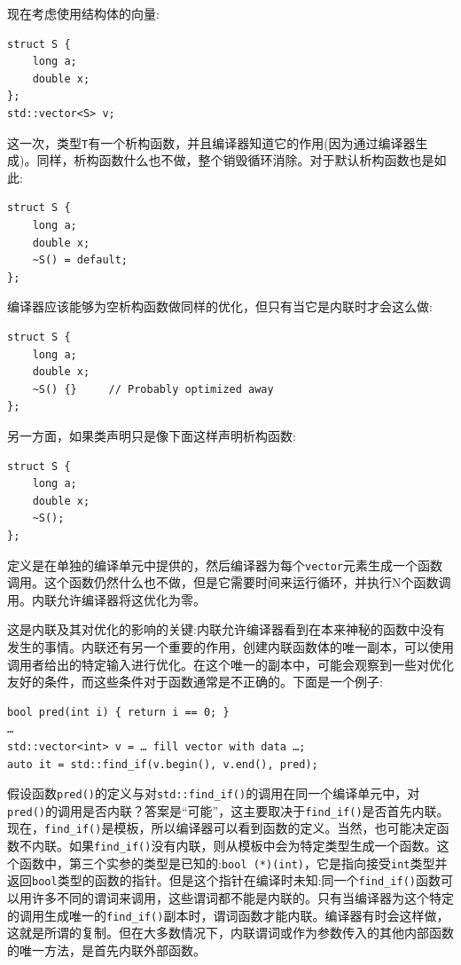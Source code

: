现在考虑使用结构体的向量:

\begin{lstlisting}[style=styleCXX]
struct S {
	long a;
	double x;
};
std::vector<S> v;
\end{lstlisting}

这一次，类型\texttt{T}有一个析构函数，并且编译器知道它的作用(因为通过编译器生成)。同样，析构函数什么也不做，整个销毁循环消除。对于默认析构函数也是如此:

\begin{lstlisting}[style=styleCXX]
struct S {
	long a;
	double x;
	~S() = default;
};
\end{lstlisting}

编译器应该能够为空析构函数做同样的优化，但只有当它是内联时才会这么做:

\begin{lstlisting}[style=styleCXX]
struct S {
	long a;
	double x;
	~S() {}     // Probably optimized away
};
\end{lstlisting}

另一方面，如果类声明只是像下面这样声明析构函数:

\begin{lstlisting}[style=styleCXX]
struct S {
	long a;
	double x;
	~S();
};
\end{lstlisting}

定义是在单独的编译单元中提供的，然后编译器为每个\texttt{vector}元素生成一个函数调用。这个函数仍然什么也不做，但是它需要时间来运行循环，并执行N个函数调用。内联允许编译器将这优化为零。

这是内联及其对优化的影响的关键:内联允许编译器看到在本来神秘的函数中没有发生的事情。内联还有另一个重要的作用，创建内联函数体的唯一副本，可以使用调用者给出的特定输入进行优化。在这个唯一的副本中，可能会观察到一些对优化友好的条件，而这些条件对于函数通常是不正确的。下面是一个例子:

\begin{lstlisting}[style=styleCXX]
bool pred(int i) { return i == 0; }
… 
std::vector<int> v = … fill vector with data …;
auto it = std::find_if(v.begin(), v.end(), pred);
\end{lstlisting}

假设函数\texttt{pred()}的定义与对\texttt{std::find\_if()}的调用在同一个编译单元中，对\texttt{pred()}的调用是否内联？答案是“可能”，这主要取决于\texttt{find\_if()}是否首先内联。现在，\texttt{find\_if()}是模板，所以编译器可以看到函数的定义。当然，也可能决定函数不内联。如果\texttt{find\_if()}没有内联，则从模板中会为特定类型生成一个函数。这个函数中，第三个实参的类型是已知的:\texttt{bool (*)(int)}，它是指向接受\texttt{int}类型并返回\texttt{bool}类型的函数的指针。但是这个指针在编译时未知:同一个\texttt{find\_if()}函数可以用许多不同的谓词来调用，这些谓词都不能是内联的。只有当编译器为这个特定的调用生成唯一的\texttt{find\_if()}副本时，谓词函数才能内联。编译器有时会这样做，这就是所谓的复制。但在大多数情况下，内联谓词或作为参数传入的其他内部函数的唯一方法，是首先内联外部函数。 

